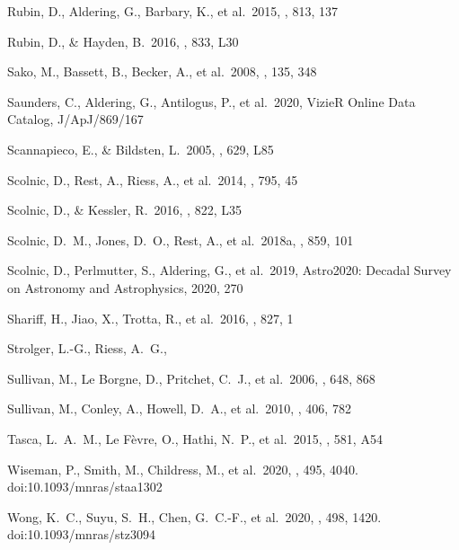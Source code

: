 \documentclass[referee]{aa}
\begin{document}
\begin{thebibliography}{}
 Rubin, D., Aldering, G., Barbary, K., et
al.\ 2015, \apj, 813, 137

 Rubin, D., \& Hayden, B.\ 2016,
\apjl, 833, L30


 Sako, M., Bassett, B., Becker, A., et al.\
2008, \aj, 135, 348

 Saunders, C., Aldering, G.,
Antilogus, P., et al.\ 2020, VizieR Online Data Catalog, J/ApJ/869/167

 Scannapieco, E., \&
Bildsten, L.\ 2005, \apjl, 629, L85 

 Scolnic, D., Rest, A., Riess, A., et
al.\ 2014, \apj, 795, 45

 Scolnic, D., \& Kessler, R.\
2016, \apjl, 822, L35

 Scolnic, D.~M., Jones, D.~O., Rest,
A., et al.\ 2018a, \apj, 859, 101

 Scolnic, D., Perlmutter, S.,
Aldering, G., et al.\ 2019, Astro2020: Decadal Survey on Astronomy and
Astrophysics, 2020, 270

 Shariff, H., Jiao, X., Trotta, R.,
et al.\ 2016, \apj, 827, 1

 Strolger, L.-G., Riess, A.~G.,

\bibitem[Sullivan et al.(2006)]{sullivan2006} Sullivan, M., Le Borgne, D.,
Pritchet, C.~J., et al.\ 2006, \apj, 648, 868 

 Sullivan, M., Conley, A., Howell,
D.~A., et al.\ 2010, \mnras, 406, 782


 Tasca, L.~A.~M., Le F{\`e}vre, O.,
Hathi, N.~P., et al.\ 2015, \aap, 581, A54


 Wiseman, P., Smith, M., Childress,
M., et al.\ 2020, \mnras, 495, 4040. doi:10.1093/mnras/staa1302

\bibitem[Wong et al.(2020)]{wong2019} Wong, K.~C., Suyu, S.~H., Chen, G.~C.-F.,
et al.\ 2020, \mnras, 498, 1420. doi:10.1093/mnras/stz3094

\end{thebibliography}
\end{document}
